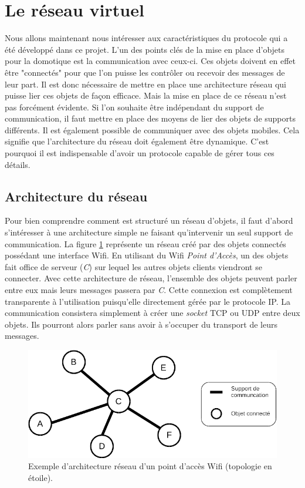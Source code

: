 \section{Le réseau virtuel}
	Nous allons maintenant nous intéresser aux caractéristiques du protocole qui a été
	développé dans ce projet. L'un des points clés de la mise en place d'objets pour la domotique 
	est la communication avec ceux-ci. Ces objets doivent en effet être "connectés" pour que l'on
	puisse les contrôler ou recevoir des messages de leur part. Il est donc nécessaire de mettre en 
	place une architecture réseau qui puisse lier ces objets de façon efficace. Mais la mise en place
	de ce réseau n'est pas forcément évidente. Si l'on souhaite être indépendant du support de 
	communication, il faut mettre en place des moyens de lier des objets de supports différents. Il 
	est également possible de communiquer avec des objets mobiles. Cela signifie que l'architecture 
	du réseau doit également être dynamique. C'est pourquoi il est indispensable d'avoir un protocole
	capable de gérer tous ces détails.
	
	\subsection{Architecture du réseau}
		Pour bien comprendre comment est structuré un réseau d'objets, il faut d'abord s'intéresser 
		à une architecture simple ne faisant qu'intervenir un seul support de communication. La figure
		\ref{netStar} représente un réseau créé par des objets connectés possédant une interface Wifi.
		En utilisant du Wifi \emph{Point d'Accès}, un des objets fait office de serveur (\emph{C}) 
		sur lequel les autres objets clients viendront se connecter. Avec cette architecture de 
		réseau, l'ensemble des objets peuvent parler entre eux mais leurs messages passera par 
		\emph{C}. Cette connexion est complètement transparente à l'utilisation puisqu'elle 
		directement gérée par le protocole IP. La communication consistera simplement à créer une
		\emph{socket} TCP ou UDP entre deux objets. Ils pourront alors parler sans avoir à s'occuper
		du transport de leurs messages.
		
		\begin{figure}[!ht]
         \centering
         \includegraphics[width=.8\textwidth]{img/reseau_etoile.png}
         \caption{Exemple d'architecture réseau d'un point d'accès Wifi (topologie en étoile).}
         \label{netStar}
      \end{figure}

